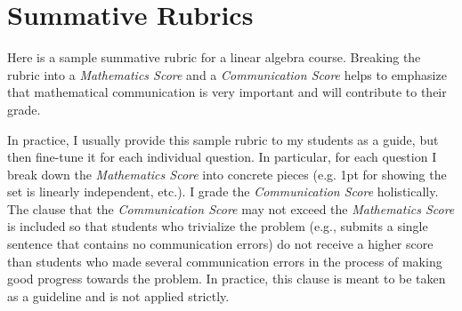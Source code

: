 \documentclass[12pt]{book}
\begin{document}



\section{Summative Rubrics}\label{ch-sum}
Here is a sample summative rubric for a linear algebra course. Breaking the rubric into a \emph{Mathematics Score} and a \emph{Communication Score} helps to emphasize that mathematical communication is very important and will contribute to their grade.

In practice, I usually provide this sample rubric to my students as a guide, but then fine-tune it for each individual question. In particular, for each question I break down the \emph{Mathematics Score} into concrete pieces (e.g. 1pt for showing the set is linearly independent, etc.). I grade the \emph{Communication Score} holistically. The clause that the \emph{Communication Score} may not exceed the \emph{Mathematics Score} is included so that students who trivialize the problem (e.g., submits a single sentence that contains no communication errors) do not receive a higher score than students who made several communication errors in the process of making good progress towards the problem. In practice, this clause is meant to be taken as a guideline and is not applied strictly.




%
%
\end{document}
